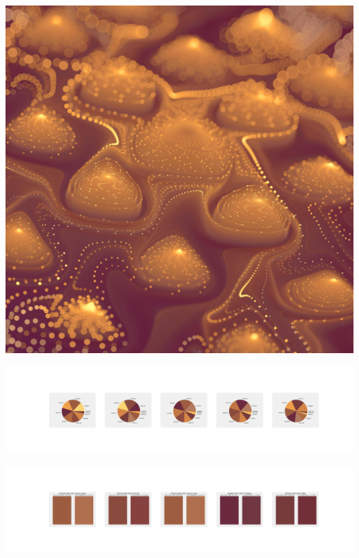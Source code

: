 \documentclass[11pt]{article}
\begin{document}
\begin{landscape}
    \begin{center}
    \includegraphics[width=\textwidth]{./nbimg/file (411).jpg}
    \end{center}

    \begin{center}
    \includegraphics[width=250mm]{./nbimg/pie-347.jpg}
    \end{center}

    \begin{center}
    \includegraphics[width=250mm]{./nbimg/peak-347.jpg}
    \end{center}
    


\end{landscape}
\end{document}

